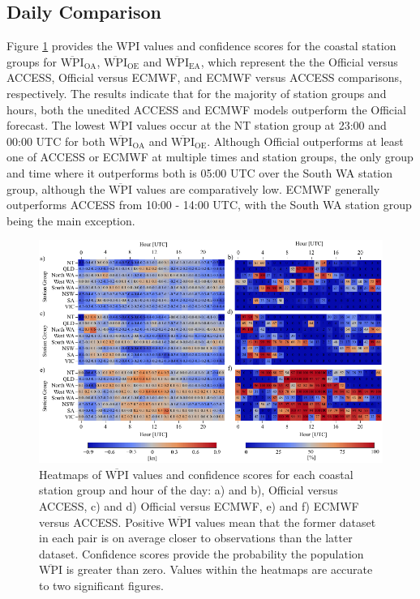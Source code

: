 \documentclass{ametsoc}
\begin{document}
\subsection{Daily Comparison}
\label{Sec:Daily}
Figure \ref{Fig:wpi_coastal} provides the WPI values and confidence scores for the coastal station groups for $\overline{\text{WPI}}_\text{OA}$, $\overline{\text{WPI}}_\text{OE}$ and $\overline{\text{WPI}}_\text{EA}$, which represent the the Official versus ACCESS, Official versus ECMWF, and ECMWF versus ACCESS comparisons, respectively. The results indicate that for the majority of station groups and hours, both the unedited ACCESS and ECMWF models outperform the Official forecast. The lowest $\overline{\text{WPI}}$ values occur at the NT station group at 23:00 and 00:00 UTC for both $\overline{\text{WPI}}_\text{OA}$ and $\overline{\text{WPI}}_\text{OE}$. Although Official outperforms at least one of ACCESS or ECMWF at multiple times and station groups, the only group and time where it outperforms both is 05:00 UTC over the South WA station group, although the $\overline{\text{WPI}}$ values are comparatively low. ECMWF generally outperforms ACCESS from 10:00 - 14:00 UTC, with the South WA station group being the main exception.    

\begin{figure}
\centering
\includegraphics[width=39pc]{wpi_coastal.pdf}
\caption{Heatmaps of $\overline{\text{WPI}}$ values and confidence scores for each coastal station group and hour of the day: a) and b), Official versus ACCESS, c) and d) Official versus ECMWF, e) and f) ECMWF versus ACCESS. Positive $\overline{\text{WPI}}$ values mean that the former dataset in each pair is on average closer to observations than the latter dataset. Confidence scores provide the probability the population $\overline{\text{WPI}}$ is greater than zero. Values within the heatmaps are accurate to two significant figures.}
\label{Fig:wpi_coastal}
\end{figure}
\end{document}
